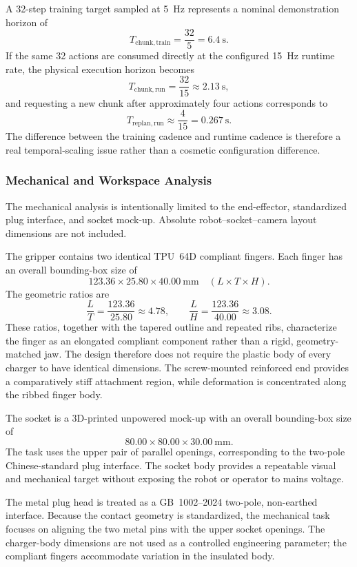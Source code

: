 \documentclass[12pt, letterpaper]{article}
\begin{document}
A 32-step training target sampled at 5~Hz represents a nominal demonstration horizon of
\[
T_{\mathrm{chunk,train}}=\frac{32}{5}=\SI{6.4}{\second}.
\]
If the same 32 actions are consumed directly at the configured 15~Hz runtime rate, the physical execution horizon becomes
\[
T_{\mathrm{chunk,run}}=\frac{32}{15}\approx\SI{2.13}{\second},
\]
and requesting a new chunk after approximately four actions corresponds to
\[
T_{\mathrm{replan,run}}\approx\frac{4}{15}
=\SI{0.267}{\second}.
\]
The difference between the training cadence and runtime cadence is therefore a real temporal-scaling issue rather than a cosmetic configuration difference.

\subsubsection{Mechanical and Workspace Analysis}

The mechanical analysis is intentionally limited to the end-effector, standardized plug interface, and socket mock-up. Absolute robot--socket--camera layout dimensions are not included.

The gripper contains two identical TPU~64D compliant fingers. Each finger has an overall bounding-box size of
\[
123.36\times25.80\times40.00~\mathrm{mm}
\quad (L\times T\times H).
\]
The geometric ratios are
\[
\frac{L}{T}=\frac{123.36}{25.80}\approx4.78,
\qquad
\frac{L}{H}=\frac{123.36}{40.00}\approx3.08.
\]
These ratios, together with the tapered outline and repeated ribs, characterize the finger as an elongated compliant component rather than a rigid, geometry-matched jaw. The design therefore does not require the plastic body of every charger to have identical dimensions. The screw-mounted reinforced end provides a comparatively stiff attachment region, while deformation is concentrated along the ribbed finger body.

The socket is a 3D-printed unpowered mock-up with an overall bounding-box size of
\[
80.00\times80.00\times30.00~\mathrm{mm}.
\]
The task uses the upper pair of parallel openings, corresponding to the two-pole Chinese-standard plug interface. The socket body provides a repeatable visual and mechanical target without exposing the robot or operator to mains voltage.

The metal plug head is treated as a GB~1002--2024 two-pole, non-earthed interface. Because the contact geometry is standardized, the mechanical task focuses on aligning the two metal pins with the upper socket openings. The charger-body dimensions are not used as a controlled engineering parameter; the compliant fingers accommodate variation in the insulated body.
\end{document}
